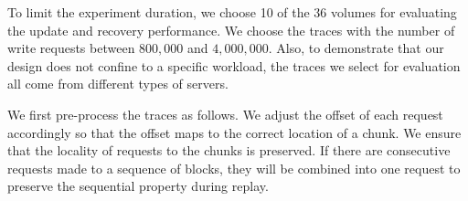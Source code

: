 

To limit the experiment duration, we choose 10 of the 36 volumes for
evaluating the update and recovery performance. We choose the traces with the
number of write requests between $800,000$ and $4,000,000$. Also, to
demonstrate that our design does not confine to a specific workload, the
traces we select for evaluation all come from different types of servers.

We first pre-process the traces as follows.
We adjust the offset of each request accordingly so that the offset maps to
the correct location of a chunk.  We ensure that the locality of requests
to the chunks is preserved. 
If there are consecutive requests made to a sequence of blocks, they will be
combined into one request to preserve the sequential property during replay.

